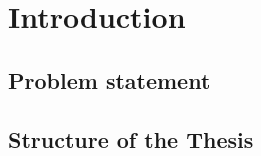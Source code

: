 \chapter{Introduction}
\label{chapter:intro}




\section{Problem statement}



\section{Structure of the Thesis}
\label{section:structure} 


